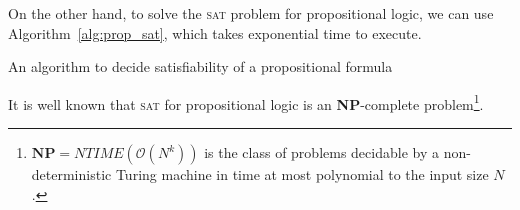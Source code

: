 \documentclass{article}
\theoremstyle{example}
\theoremstyle{remark}
\newcommand{\BigO}{\mathcal{O}}
\newcommand{\abs}[1]{\left\lvert{#1}\right\rvert}
\begin{document}
On the other hand, to solve the \textsc{sat} problem for propositional logic, we can use
Algorithm~\ref{alg:prop_sat}, which takes exponential time to execute.
\begin{algorithm}
	\centering
	\begin{algorithmic}
		\State{\(M \gets {\left(\bot\right)}^{\abs{\phi}}\)}
		\While{\(M \neq {\left(\top\right)}^{\abs{\phi}}\)}
		\EndIf{}
		\EndWhile{}
		\EndIf{}
		\EndFunction{}
	\end{algorithmic}
	\caption{An algorithm to decide satisfiability of a propositional formula}\label{alg:prop_sat}
\end{algorithm}

\noindent It is well known that \textsc{sat} for propositional logic is an \textbf{NP}-complete
problem\footnote{\(\textbf{NP} = NTIME\left(\BigO\left(N^k\right)\right)\) is the class of problems decidable
	by a non-deterministic Turing machine in time at most polynomial to the input size \(N\).}.
\end{document}
